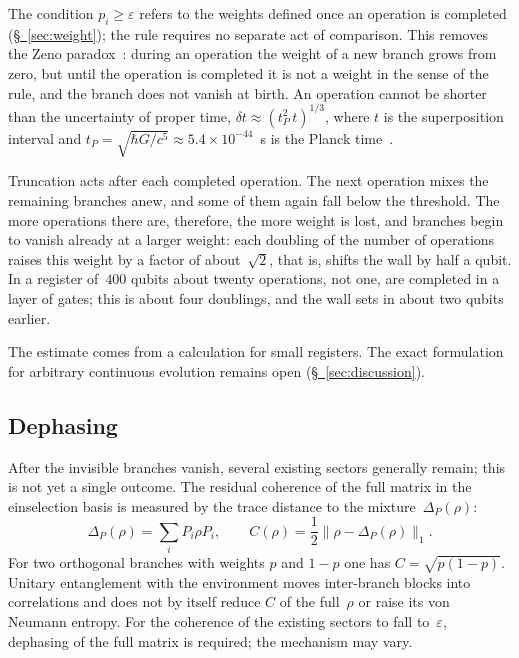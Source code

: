 \documentclass[11pt,a4paper]{article}
\begin{document}
The condition $p_i\ge\varepsilon$ refers to the weights defined once an operation is completed (\hyperref[sec:weight]{\S~\ref*{sec:weight}}); the rule requires no separate act of comparison. This removes the Zeno paradox~\cite{misra1977}: during an operation the weight of a new branch grows from zero, but until the operation is completed it is not a weight in the sense of the rule, and the branch does not vanish at birth. An operation cannot be shorter than the uncertainty of proper time, $\delta t\approx(t_P^2\,t)^{1/3}$, where $t$ is the superposition interval and $t_P=\sqrt{\hbar G/c^5}\approx5.4\times10^{-44}$~s is the Planck time~\cite{karolyhazy1966,ponfilenok2026bdpt}.

Truncation acts after each completed operation. The next operation mixes the remaining branches anew, and some of them again fall below the threshold. The more operations there are, therefore, the more weight is lost, and branches begin to vanish already at a larger weight: each doubling of the number of operations raises this weight by a factor of about~$\sqrt2$, that is, shifts the wall by half a qubit. In a register of~$400$ qubits about twenty operations, not one, are completed in a layer of gates; this is about four doublings, and the wall sets in about two qubits earlier.

The estimate comes from a calculation for small registers. The exact formulation for arbitrary continuous evolution remains open (\hyperref[sec:discussion]{\S~\ref*{sec:discussion}}).

\subsection{Dephasing}
\label{sec:dephasing}

After the invisible branches vanish, several existing sectors generally remain; this is not yet a single outcome. The residual coherence of the full matrix in the einselection basis is measured by the trace distance to the mixture~$\Delta_P(\rho)$:
\begin{equation}
\Delta_P(\rho)=\sum_i P_i\rho P_i,
\qquad
C(\rho)=\frac12\bigl\|\rho-\Delta_P(\rho)\bigr\|_1.
\end{equation}
For two orthogonal branches with weights $p$ and $1-p$ one has $C=\sqrt{p(1-p)}$. Unitary entanglement with the environment moves inter-branch blocks into correlations and does not by itself reduce $C$ of the full~$\rho$ or raise its von Neumann entropy. For the coherence of the existing sectors to fall to~$\varepsilon$, dephasing of the full matrix is required; the mechanism may vary.
\end{document}
